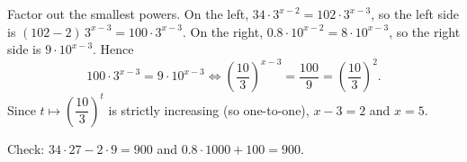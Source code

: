 Factor out the smallest powers. On the left, $34\cdot3^{x-2}=102\cdot3^{x-3}$, so the left side is $(102-2)\,3^{x-3}=100\cdot3^{x-3}$. On the right, $0.8\cdot10^{x-2}=8\cdot10^{x-3}$, so the right side is $9\cdot10^{x-3}$. Hence
\[100\cdot3^{x-3}=9\cdot10^{x-3}\iff\left(\dfrac{10}{3}\right)^{x-3}=\dfrac{100}{9}=\left(\dfrac{10}{3}\right)^2.\]
Since $t\mapsto\left(\dfrac{10}{3}\right)^t$ is strictly increasing (so one-to-one), $x-3=2$ and $x=\boxed{5}$.

Check: $34\cdot27-2\cdot9=900$ and $0.8\cdot1000+100=900$.
